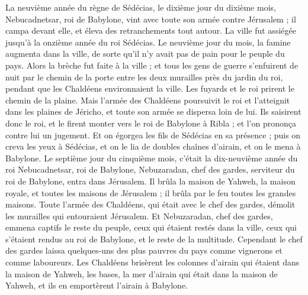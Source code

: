 \begin{multicols}{2}
\VerseOne{}La neuvième année du règne de Sédécias, le dixième jour du dixième mois, Nebucadnetsar, roi de Babylone, vint avec toute son armée contre Jérusalem ; il campa devant elle, et éleva des retranchements tout autour.
La ville fut assiégée jusqu’à la onzième année du roi Sédécias.
Le neuvième jour du mois, la famine augmenta dans la ville, de sorte qu’il n’y avait pas de pain pour le peuple du pays.
Alors la brèche fut faite à la ville ; et tous les gens de guerre s’enfuirent de nuit par le chemin de la porte entre les deux murailles près du jardin du roi, pendant que les Chaldéens environnaient la ville. Les fuyards et le roi prirent le chemin de la plaine.
Mais l’armée des Chaldéens poursuivit le roi et l’atteignit dans les plaines de Jéricho, et toute son armée se dispersa loin de lui.
Ils saisirent donc le roi, et le firent monter vers le roi de Babylone à Ribla ; et l’on prononça contre lui un jugement.
Et on égorgea les fils de Sédécias en sa présence ; puis on creva les yeux à Sédécias, et on le lia de doubles chaînes d’airain, et on le mena à Babylone.
Le septième jour du cinquième mois, c’était la dix-neuvième année du roi Nebucadnetsar, roi de Babylone, Nebuzaradan, chef des gardes, serviteur du roi de Babylone, entra dans Jérusalem.
Il brûla la maison de Yahweh, la maison royale, et toutes les maisons de Jérusalem ; il brûla par le feu toutes les grandes maisons.
Toute l’armée des Chaldéens, qui était avec le chef des gardes, démolit les murailles qui entouraient Jérusalem.
Et Nebuzaradan, chef des gardes, emmena captifs le reste du peuple, ceux qui étaient restés dans la ville, ceux qui s’étaient rendus au roi de Babylone, et le reste de la multitude.
Cependant le chef des gardes laissa quelques-uns des plus pauvres du pays comme vignerons et comme laboureurs.
Les Chaldéens brisèrent les colonnes d’airain qui étaient dans la maison de Yahweh, les bases, la mer d’airain qui était dans la maison de Yahweh, et ils en emportèrent l’airain à Babylone.

\end{multicols}
